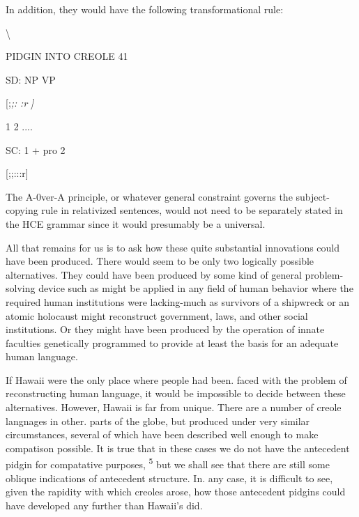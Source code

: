 In addition, they would have the following transformational rule:

{\textbackslash}

PIDGIN INTO CREOLE 41

\ea\label{ex:111}
 SD: NP VP
\glt
\z

[;\textit{;}\textit{:} \textit{:r} \textit{]}

1 2 ....

SC: 1 + pro 2

[;;:::r]

The A-0ver-A principle, or whatever general constraint governs the subject-copying rule in relativized sentences, would not need to be separately stated in the HCE grammar since it would presumably be a universal.

All that remains for us is to ask how these quite substantial innovations could have been produced. There would seem to be only two logically possible alternatives. They could have been produced by some kind of general problem-solving device such as might be applied in any field of human behavior where the required human institutions were lacking-much as survivors of a shipwreck or an atomic holocaust might reconstruct government, laws, and other social institutions. Or they might have been produced by the operation of innate faculties genetically programmed to provide at least the basis for an adequate human language.

If Hawaii were the only place where people had been. faced with the problem of reconstructing human language, it would be impossible to decide between these alternatives. However, Hawaii is far from unique. There are a number of creole langnages in other. parts of the globe, but produced under very similar circumstances, several of which have been described well enough to make compatison possible. It is true that in these cases we do not have the antecedent pidgin for compatative purposes, \textsuperscript{5} but we shall see that there are still some oblique indications of antecedent structure. In. any case, it is difficult to see, given the rapidity with which creoles arose, how those antecedent pidgins could have developed any further than Hawaii's did.


